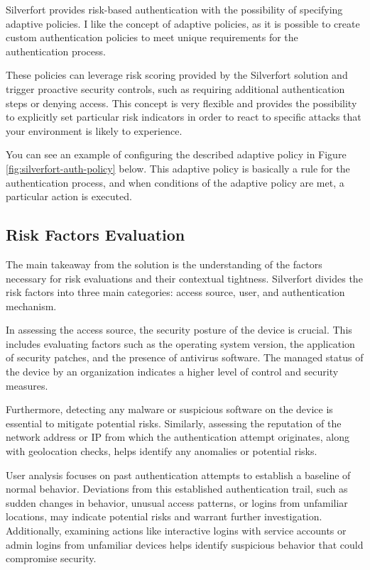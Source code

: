 Silverfort provides risk-based authentication with the possibility of specifying adaptive policies.
I like the concept of adaptive policies, as it is possible to create custom authentication policies to meet unique requirements for the authentication process.

These policies can leverage risk scoring provided by the Silverfort solution and trigger proactive security controls, such as requiring additional authentication steps or denying access. 
This concept is very flexible and provides the possibility to explicitly set particular risk indicators in order to react to specific attacks that your environment is likely to experience.

You can see an example of configuring the described adaptive policy in Figure \ref{fig:silverfort-auth-policy} below.
This adaptive policy is basically a rule for the authentication process, and when conditions of the adaptive policy are met, a particular action is executed.\cite{example_silverfort}

\subsection*{Risk Factors Evaluation}

The main takeaway from the solution is the understanding of the factors necessary for risk evaluations and their contextual tightness.
Silverfort divides the risk factors into three main categories: access source, user, and authentication mechanism.

In assessing the access source, the security posture of the device is crucial.
This includes evaluating factors such as the operating system version, the application of security patches, and the presence of antivirus software.
The managed status of the device by an organization indicates a higher level of control and security measures.

Furthermore, detecting any malware or suspicious software on the device is essential to mitigate potential risks.
Similarly, assessing the reputation of the network address or IP from which the authentication attempt originates, along with geolocation checks, helps identify any anomalies or potential risks.

User analysis focuses on past authentication attempts to establish a baseline of normal behavior.
Deviations from this established authentication trail, such as sudden changes in behavior, unusual access patterns, or logins from unfamiliar locations, may indicate potential risks and warrant further investigation.
Additionally, examining actions like interactive logins with service accounts or admin logins from unfamiliar devices helps identify suspicious behavior that could compromise security.

